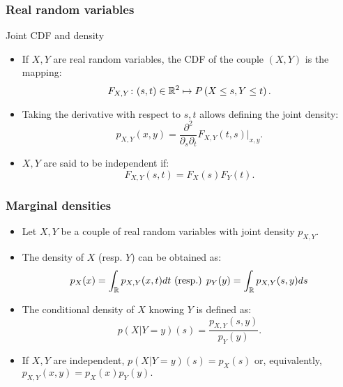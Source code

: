\documentclass[main.tex]{subfiles}
\begin{document}
\begin{frame}
    \frametitle{Real random variables}
\begin{block}{Joint CDF and density}
    \begin{itemize}
        \item<+-> If $X,Y$ are real random variables, the CDF of the couple $(X,Y)$ is the mapping:
        \begin{equation}
            F_{X,Y} \colon (s,t) \in \mathbb{R}^2 \mapsto P\left( X \leq s, Y \leq t \right).
        \end{equation}
        \item<+-> Taking the derivative with respect to $s,t$ allows defining the joint density:
        \begin{equation}
            p_{X,Y}(x,y)= \frac{\partial^2}{\partial_s \partial_t} F_{X,Y}(t,s) \vert_{x,y}.
        \end{equation}
        \item<+-> $X,Y$ are said to be independent if:
        \begin{equation}
            F_{X,Y}(s,t) = F_X(s) F_Y(t). 
        \end{equation}
    \end{itemize}
\end{block}
\end{frame}
\begin{frame}
    \frametitle{Marginal densities}
   \begin{itemize}
    \item<+-> Let $X,Y$ be a couple of real random variables with joint density $p_{X,Y}.$
    \item<+-> The density of $X$ (resp. $Y$) can be obtained as:
    \begin{equation}
        p_X(x) = \int_{\mathbb{R}} p_{X,Y}(x,t) dt \text{ (resp.) } p_Y(y) = \int_{\mathbb{R}} p_{X,Y}(s,y) ds
    \end{equation}
    \item<+-> The conditional density of $X$ knowing $Y$ is defined as:
    \begin{equation}
        p\left(X\vert Y=y\right)(s) = \frac{p_{X,Y}(s,y)}{p_Y(y)}.
    \end{equation}
    \item<+-> If $X,Y$ are independent, $p(X \vert Y=y)(s) = p_X(s)$ or, equivalently,
    $p_{X,Y}(x,y)=p_X(x)p_Y(y).$
   \end{itemize} 
\end{frame}
\end{document}
